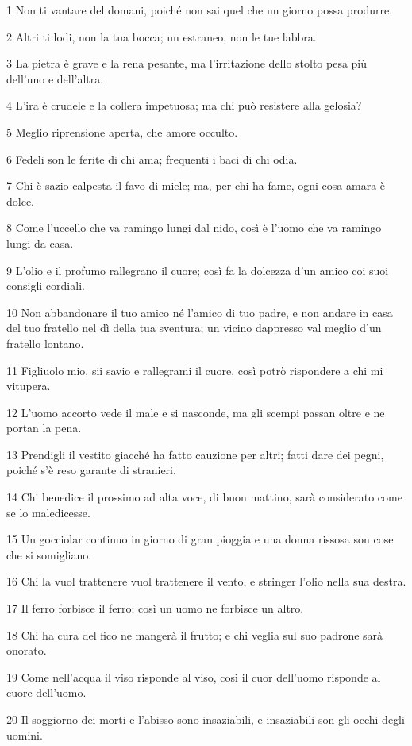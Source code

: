 \par 1 Non ti vantare del domani, poiché non sai quel che un giorno possa produrre.
\par 2 Altri ti lodi, non la tua bocca; un estraneo, non le tue labbra.
\par 3 La pietra è grave e la rena pesante, ma l'irritazione dello stolto pesa più dell'uno e dell'altra.
\par 4 L'ira è crudele e la collera impetuosa; ma chi può resistere alla gelosia?
\par 5 Meglio riprensione aperta, che amore occulto.
\par 6 Fedeli son le ferite di chi ama; frequenti i baci di chi odia.
\par 7 Chi è sazio calpesta il favo di miele; ma, per chi ha fame, ogni cosa amara è dolce.
\par 8 Come l'uccello che va ramingo lungi dal nido, così è l'uomo che va ramingo lungi da casa.
\par 9 L'olio e il profumo rallegrano il cuore; così fa la dolcezza d'un amico coi suoi consigli cordiali.
\par 10 Non abbandonare il tuo amico né l'amico di tuo padre, e non andare in casa del tuo fratello nel dì della tua sventura; un vicino dappresso val meglio d'un fratello lontano.
\par 11 Figliuolo mio, sii savio e rallegrami il cuore, così potrò rispondere a chi mi vitupera.
\par 12 L'uomo accorto vede il male e si nasconde, ma gli scempi passan oltre e ne portan la pena.
\par 13 Prendigli il vestito giacché ha fatto cauzione per altri; fatti dare dei pegni, poiché s'è reso garante di stranieri.
\par 14 Chi benedice il prossimo ad alta voce, di buon mattino, sarà considerato come se lo maledicesse.
\par 15 Un gocciolar continuo in giorno di gran pioggia e una donna rissosa son cose che si somigliano.
\par 16 Chi la vuol trattenere vuol trattenere il vento, e stringer l'olio nella sua destra.
\par 17 Il ferro forbisce il ferro; così un uomo ne forbisce un altro.
\par 18 Chi ha cura del fico ne mangerà il frutto; e chi veglia sul suo padrone sarà onorato.
\par 19 Come nell'acqua il viso risponde al viso, così il cuor dell'uomo risponde al cuore dell'uomo.
\par 20 Il soggiorno dei morti e l'abisso sono insaziabili, e insaziabili son gli occhi degli uomini.
